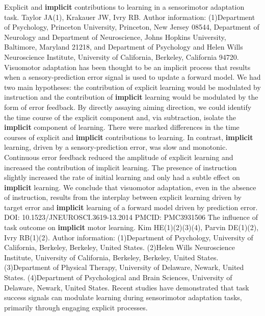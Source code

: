 \documentclass[11pt]{article}
\begin{document}
\newline  [  59  ]   Explicit and   \textbf {  implicit  }   contributions to learning in a sensorimotor adaptation  task.  Taylor JA(1), Krakauer JW, Ivry RB.  Author information: (1)Department of Psychology, Princeton University, Princeton, New Jersey 08544,  Department of Neurology and Department of Neuroscience, Johns Hopkins  University, Baltimore, Maryland 21218, and Department of Psychology and Helen  Wills Neuroscience Institute, University of California, Berkeley, California  94720.  Visuomotor adaptation has been thought to be an implicit process that results  when a sensory-prediction error signal is used to update a forward model.
\newline  [  60  ]   We had two main hypotheses: the  contribution of explicit learning would be modulated by instruction and the  contribution of   \textbf {  implicit  }   learning would be modulated by the form of error  feedback.
\newline  [  61  ]   By directly assaying aiming direction, we could identify the time  course of the explicit component and, via subtraction, isolate the   \textbf {  implicit  }    component of learning.
\newline  [  62  ]   There were marked differences in the time courses of  explicit and   \textbf {  implicit  }   contributions to learning.
\newline  [  63  ]   In contrast,   \textbf {  implicit  }    learning, driven by a sensory-prediction error, was slow and monotonic.  Continuous error feedback reduced the amplitude of explicit learning and  increased the contribution of implicit learning.
\newline  [  64  ]   The presence of instruction  slightly increased the rate of initial learning and only had a subtle effect on    \textbf {  implicit  }   learning.
\newline  [  65  ]   We conclude that visuomotor adaptation, even in the absence  of instruction, results from the interplay between explicit learning driven by  target error and   \textbf {  implicit  }   learning of a forward model driven by prediction  error.  DOI: 10.1523/JNEUROSCI.3619-13.2014 PMCID: PMC3931506
\newline  [  66  ]   The influence of task outcome on   \textbf {  implicit  }   motor learning.  Kim HE(1)(2)(3)(4), Parvin DE(1)(2), Ivry RB(1)(2).  Author information: (1)Department of Psychology, University of California, Berkeley, Berkeley,  United States. (2)Helen Wills Neuroscience Institute, University of California, Berkeley,  Berkeley, United States. (3)Department of Physical Therapy, University of Delaware, Newark, United  States. (4)Department of Psychological and Brain Sciences, University of Delaware,  Newark, United States.  Recent studies have demonstrated that task success signals can modulate learning  during sensorimotor adaptation tasks, primarily through engaging explicit  processes.
\end{document}
